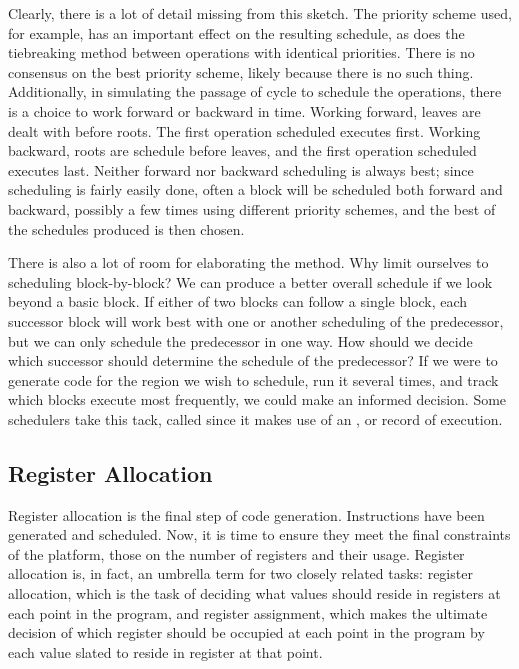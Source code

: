 Clearly, there is a lot of detail missing from this sketch. The priority scheme used, for example, has an important effect on the resulting schedule, as does the tiebreaking method between operations with identical priorities. There is no consensus on the best priority scheme, likely because there is no such thing. Additionally, in simulating the passage of cycle to schedule the operations, there is a choice to work forward or backward in time. Working forward, leaves are dealt with before roots. The first operation scheduled executes first. Working backward, roots are schedule before leaves, and the first operation scheduled executes last. Neither forward nor backward scheduling is always best; since scheduling is fairly easily done, often a block will be scheduled both forward and backward, possibly a few times using different priority schemes, and the best of the schedules produced is then chosen.

There is also a lot of room for elaborating the method. Why limit ourselves to scheduling block-by-block? We can produce a better overall schedule if we look beyond a basic block. If either of two blocks can follow a single block, each successor block will work best with one or another scheduling of the predecessor, but we can only schedule the predecessor in one way. How should we decide which successor should determine the schedule of the predecessor? If we were to generate code for the region we wish to schedule, run it several times, and track which blocks execute most frequently, we could make an informed decision. Some schedulers take this tack, called  since it makes use of an , or record of execution.%

\subsection{Register Allocation}
Register allocation is the final step of code generation. Instructions have been generated and scheduled. Now, it is time to ensure they meet the final constraints of the platform, those on the number of registers and their usage. Register allocation is, in fact, an umbrella term for two closely related tasks: register allocation, which is the task of deciding what values should reside in registers at each point in the program, and register assignment, which makes the ultimate decision of which register should be occupied at each point in the program by each value slated to reside in register at that point. %